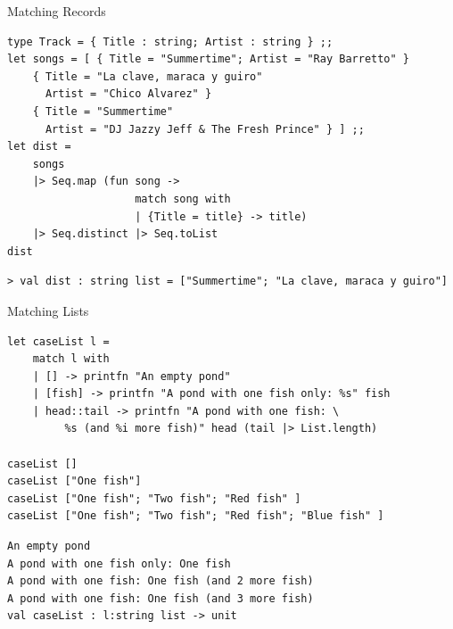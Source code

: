 \documentclass[t]{beamer}
\begin{document}
\begin{frame}[label={sec:org79f2cc5},fragile]{Matching Records}
 \begin{verbatim}
type Track = { Title : string; Artist : string } ;;
let songs = [ { Title = "Summertime"; Artist = "Ray Barretto" }
    { Title = "La clave, maraca y guiro"
      Artist = "Chico Alvarez" }
    { Title = "Summertime"
      Artist = "DJ Jazzy Jeff & The Fresh Prince" } ] ;;
let dist =
    songs
    |> Seq.map (fun song -> 
                    match song with 
                    | {Title = title} -> title) 
    |> Seq.distinct |> Seq.toList
dist
\end{verbatim}

\begin{verbatim}
> val dist : string list = ["Summertime"; "La clave, maraca y guiro"]
\end{verbatim}
\end{frame}

\begin{frame}[label={sec:org8efba8e},fragile]{Matching Lists}
 \begin{verbatim}
let caseList l = 
    match l with
    | [] -> printfn "An empty pond" 
    | [fish] -> printfn "A pond with one fish only: %s" fish 
    | head::tail -> printfn "A pond with one fish: \
         %s (and %i more fish)" head (tail |> List.length)

caseList []
caseList ["One fish"]
caseList ["One fish"; "Two fish"; "Red fish" ]
caseList ["One fish"; "Two fish"; "Red fish"; "Blue fish" ]
\end{verbatim}

\begin{verbatim}
An empty pond
A pond with one fish only: One fish
A pond with one fish: One fish (and 2 more fish)
A pond with one fish: One fish (and 3 more fish)
val caseList : l:string list -> unit
\end{verbatim}
\end{frame}
\end{document}
